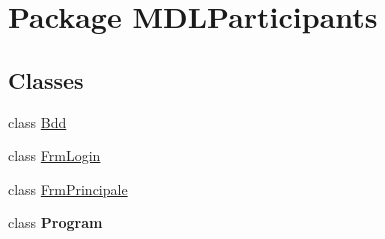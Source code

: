 \hypertarget{namespace_m_d_l_participants}{}\section{Package M\+D\+L\+Participants}
\label{namespace_m_d_l_participants}
\subsection*{Classes}
\begin{DoxyCompactItemize}
\item 
class \hyperlink{class_m_d_l_participants_1_1_bdd}{Bdd}
\item 
class \hyperlink{class_m_d_l_participants_1_1_frm_login}{Frm\+Login}
\item 
class \hyperlink{class_m_d_l_participants_1_1_frm_principale}{Frm\+Principale}
\item 
class {\bfseries Program}
\end{DoxyCompactItemize}
